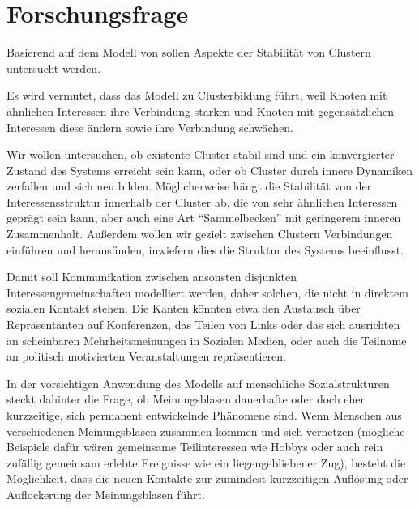 \documentclass[11pt, a4paper]{scrartcl}
\begin{document}
\section{Forschungsfrage}

Basierend auf dem Modell von \autocite{Koehler-Bussmeier2018} sollen Aspekte der Stabilität von Clustern untersucht werden.

Es wird vermutet, dass das Modell zu Clusterbildung führt, weil Knoten mit ähnlichen Interessen ihre Verbindung stärken und Knoten mit gegensätzlichen Interessen diese ändern sowie ihre Verbindung schwächen.

Wir wollen untersuchen, ob existente Cluster stabil sind und ein konvergierter Zustand des Systems erreicht sein kann, oder ob Cluster durch innere Dynamiken zerfallen und sich neu bilden. Möglicherweise hängt die Stabilität von der Interessensstruktur innerhalb der Cluster ab, die von sehr ähnlichen Interessen geprägt sein kann, aber auch eine Art "`Sammelbecken"' mit geringerem inneren Zusammenhalt. Außerdem wollen wir gezielt zwischen Clustern Verbindungen einführen und herausfinden, inwiefern dies die Struktur des Systems beeinflusst.

Damit soll Kommunikation zwischen ansonsten disjunkten Interessengemeinschaften modelliert werden, daher solchen, die nicht in direktem sozialen Kontakt stehen. Die Kanten könnten etwa den Austausch über Repräsentanten auf Konferenzen,  das Teilen von Links oder das sich ausrichten an scheinbaren Mehrheitsmeinungen in Sozialen Medien, oder auch die Teilname an politisch motivierten Veranstaltungen repräsentieren.

In der vorsichtigen Anwendung des Modells auf menschliche Sozialstrukturen steckt dahinter die Frage, ob Meinungsblasen dauerhafte oder doch eher kurzzeitige, sich permanent entwickelnde Phänomene sind. Wenn Menschen aus verschiedenen Meinungsblasen zusammen kommen und sich vernetzen (mögliche Beispiele dafür wären gemeinsame Teilinteressen wie Hobbys oder auch rein zufällig gemeinsam erlebte Ereignisse wie ein liegengebliebener Zug), besteht die Möglichkeit, dass die neuen Kontakte zur zumindest kurzzeitigen Auflösung oder Auflockerung der Meinungsblasen führt. 
\end{document}
